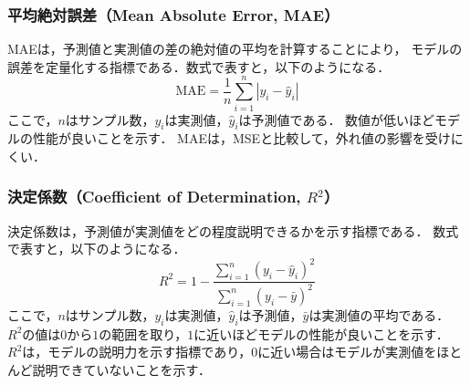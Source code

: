 \subsubsection*{平均絶対誤差（Mean Absolute Error, MAE）}
MAEは，予測値と実測値の差の絶対値の平均を計算することにより，
モデルの誤差を定量化する指標である．数式で表すと，以下のようになる．
\begin{equation}
  \label{eq:mae}
  \mathrm{MAE} = \frac{1}{n} \sum_{i=1}^{n} |y_i - \hat{y}_i|
\end{equation}
ここで，$n$はサンプル数，$y_i$は実測値，$\hat{y}_i$は予測値である．
数値が低いほどモデルの性能が良いことを示す．
MAEは，MSEと比較して，外れ値の影響を受けにくい．

\subsubsection*{決定係数（Coefficient of Determination, $R^2$）}
決定係数は，予測値が実測値をどの程度説明できるかを示す指標である．  
数式で表すと，以下のようになる．
\begin{equation}
  \label{eq:r2}
  R^2 = 1 - \frac{\sum_{i=1}^{n} (y_i - \hat{y}_i)^2}{\sum_{i=1}^{n} (y_i - \bar{y})^2}
\end{equation}
ここで，$n$はサンプル数，$y_i$は実測値，$\hat{y}_i$は予測値，$\bar{y}$は実測値の平均である．
$R^2$の値は$0$から$1$の範囲を取り，$1$に近いほどモデルの性能が良いことを示す．
$R^2$は，モデルの説明力を示す指標であり，$0$に近い場合はモデルが実測値をほとんど説明できていないことを示す．